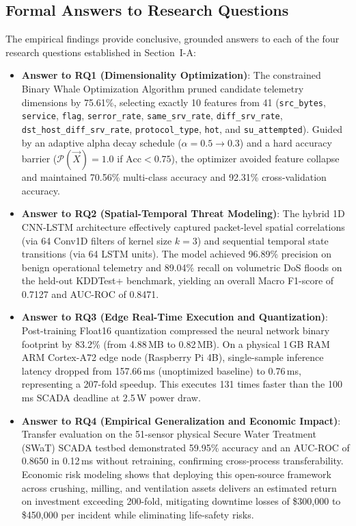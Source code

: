 \documentclass[conference]{IEEEtran}
\begin{document}
\subsection{Formal Answers to Research Questions}
The empirical findings provide conclusive, grounded answers to each of the four research questions established in Section~I-A:
\begin{itemize}
    \item \textbf{Answer to RQ1 (Dimensionality Optimization)}: The constrained Binary Whale Optimization Algorithm pruned candidate telemetry dimensions by 75.61\%, selecting exactly 10 features from 41 (\texttt{src\_bytes}, \texttt{service}, \texttt{flag}, \texttt{serror\_rate}, \texttt{same\_srv\_rate}, \texttt{diff\_srv\_rate}, \texttt{dst\_host\_diff\_srv\_rate}, \texttt{protocol\_type}, \texttt{hot}, and \texttt{su\_attempted}). Guided by an adaptive alpha decay schedule ($\alpha = 0.5 \to 0.3$) and a hard accuracy barrier ($\mathcal{P}(\vec{X}) = 1.0$ if $\text{Acc} < 0.75$), the optimizer avoided feature collapse and maintained 70.56\% multi-class accuracy and 92.31\% cross-validation accuracy.
    \item \textbf{Answer to RQ2 (Spatial-Temporal Threat Modeling)}: The hybrid 1D CNN-LSTM architecture effectively captured packet-level spatial correlations (via 64 Conv1D filters of kernel size $k=3$) and sequential temporal state transitions (via 64 LSTM units). The model achieved 96.89\% precision on benign operational telemetry and 89.04\% recall on volumetric DoS floods on the held-out KDDTest+ benchmark, yielding an overall Macro F1-score of 0.7127 and AUC-ROC of 0.8471.
    \item \textbf{Answer to RQ3 (Edge Real-Time Execution and Quantization)}: Post-training Float16 quantization compressed the neural network binary footprint by 83.2\% (from 4.88\,MB to 0.82\,MB). On a physical 1\,GB RAM ARM Cortex-A72 edge node (Raspberry Pi 4B), single-sample inference latency dropped from 157.66\,ms (unoptimized baseline) to 0.76\,ms, representing a 207-fold speedup. This executes 131 times faster than the 100\,ms SCADA deadline at 2.5\,W power draw.
    \item \textbf{Answer to RQ4 (Empirical Generalization and Economic Impact)}: Transfer evaluation on the 51-sensor physical Secure Water Treatment (SWaT) SCADA testbed demonstrated 59.95\% accuracy and an AUC-ROC of 0.8650 in 0.12\,ms without retraining, confirming cross-process transferability. Economic risk modeling shows that deploying this open-source framework across crushing, milling, and ventilation assets delivers an estimated return on investment exceeding 200-fold, mitigating downtime losses of \$300,000 to \$450,000 per incident while eliminating life-safety risks.
\end{itemize}
\end{document}

